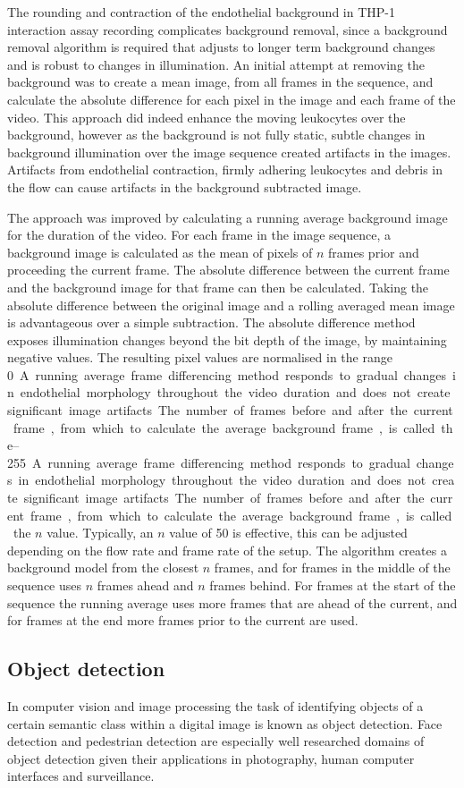 The rounding and contraction of the endothelial background in THP-1 interaction assay recording complicates background removal, since a background removal algorithm is required that adjusts to longer term background changes and is robust to changes in illumination. An initial attempt at removing the background was to create a mean image, from all frames in the sequence, and calculate the absolute difference for each pixel in the image and each frame of the video. This approach did indeed enhance the moving leukocytes over the background, however as the background is not fully static, subtle changes in background illumination over the image sequence created artifacts in the images. Artifacts from endothelial contraction, firmly adhering leukocytes and debris in the flow can cause artifacts in the background subtracted image.

The approach was improved by calculating a running average background image for the duration of the video. For each frame in the image sequence, a background image is calculated as the mean of pixels of $n$ frames prior and proceeding the current frame. The absolute difference between the current frame and the background image for that frame can then be calculated. Taking the absolute difference between the original image and a rolling averaged mean image is advantageous over a simple subtraction. The absolute difference method exposes illumination changes beyond the bit depth of the image, by maintaining negative values. The resulting pixel values are normalised in the range \SIrange{0}{255}.

A running average frame differencing method responds to gradual changes in endothelial morphology throughout the video duration and does not create significant image artifacts. The number of frames before and after the current frame, from which to calculate the average background frame, is called the $n$ value. Typically, an $n$ value of 50 is effective, this can be adjusted depending on the flow rate and frame rate of the setup. The algorithm creates a background model from the closest $n$ frames, and for frames in the middle of the sequence uses $n$ frames ahead and $n$ frames behind. For frames at the start of the sequence the running average uses more frames that are ahead of the current, and for frames at the end more frames prior to the current are used.

\subsection{Object detection}
\label{leukocytes:analysis:detection}
In computer vision and image processing the task of identifying objects of a certain semantic class within a digital image is known as object detection. Face detection and pedestrian detection are especially well researched domains of object detection given their applications in photography, human computer interfaces and surveillance.

